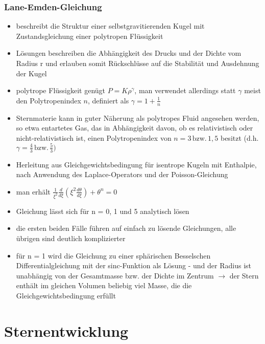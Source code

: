 \documentclass{beamer}
\begin{document}
\begin{frame}\frametitle{Lane-Emden-Gleichung}

\tiny

\begin{itemize}

\item beschreibt die Struktur einer selbstgravitierenden Kugel mit Zustandsgleichung einer polytropen Flüssigkeit
\item Lösungen beschreiben die Abhängigkeit des Drucks und der Dichte vom Radius r und erlauben somit Rückschlüsse auf die Stabilität und Ausdehnung der Kugel
\item polytrope Flüssigkeit genügt $\textstyle P = K \rho^\gamma$, man verwendet allerdings statt $\textstyle \gamma$ meist den Polytropenindex $\textstyle n$, definiert als $\textstyle \gamma = 1 + \frac{1}{n}$
\item Sternmaterie kann in guter Näherung als polytropes Fluid angesehen werden, so etwa entartetes Gas, das in Abhängigkeit davon, ob es relativistisch oder nicht-relativistisch ist, einen Polytropenindex von $\textstyle n=3\,\mathrm{bzw.}\,1,5$ besitzt (d.h. $\textstyle \gamma=\frac{4}{3}\, \mathrm{bzw.}\,\frac{5}{3})$
\item Herleitung aus Gleichgewichtsbedingung für isentrope Kugeln mit Enthalpie, nach Anwendung des Laplace-Operators und der Poisson-Gleichung
\item man erhält $\boxed{\frac{1}{\xi^2} \frac{d}{d\xi} \left({\xi^2 \frac{d\theta}{d\xi}}\right) + \theta^n = 0}$
\item Gleichung lässt sich für n = 0, 1 und 5 analytisch lösen
\item die ersten beiden Fälle führen auf einfach zu lösende Gleichungen, alle übrigen sind deutlich komplizierter
\item für n = 1 wird die Gleichung zu einer sphärischen Besselschen Differentialgleichung mit der sinc-Funktion als Lösung - und der Radius ist unabhängig von der Gesamtmasse bzw. der Dichte im Zentrum $\to$ der Stern enthält im gleichen Volumen beliebig viel Masse, die die Gleichgewichtsbedingung erfüllt

\end{itemize}

\end{frame}

\section{Sternentwicklung}
\end{document}
